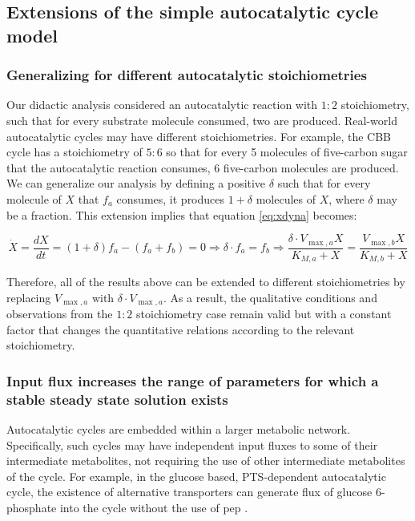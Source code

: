 \subsection{Extensions of the simple autocatalytic cycle model}
    \subsubsection{Generalizing for different autocatalytic stoichiometries}
    Our didactic analysis considered an autocatalytic reaction with $1\mathbin{:}2$ stoichiometry, such that for every substrate molecule consumed, two are produced.
    Real-world autocatalytic cycles may have different stoichiometries.
    For example, the CBB cycle has a stoichiometry of $5\mathbin{:}6$ so that for every 5 molecules of five-carbon sugar that the autocatalytic reaction consumes, 6 five-carbon molecules are produced.
    We can generalize our analysis by defining a positive $\delta$ such that for every molecule of $X$ that $f_a$ consumes, it produces $1+\delta$ molecules of $X$, where $\delta$ may be a fraction.
    This extension implies that equation \eqref{eq:xdyna} becomes:

    \begin{equation*}
      \dot X = \frac{dX}{dt} = (1+\delta)f_a - (f_a + f_b) = 0 \Rightarrow \delta \cdot f_a = f_b \Rightarrow \frac{\delta \cdot V_{\max,a}X}{K_{M,a}+X}=\frac{V_{\max,b}X}{K_{M,b}+X}
    \end{equation*}

    Therefore, all of the results above can be extended to different stoichiometries by replacing $V_{\max,a}$ with $\delta \cdot V_{\max,a}$.
    As a result, the qualitative conditions and observations from the $1\mathbin{:}2$ stoichiometry case remain valid but with a constant factor that changes the quantitative relations according to the relevant stoichiometry.
\subsubsection{Input flux increases the range of parameters for which a stable steady state solution exists}
    Autocatalytic cycles are embedded within a larger metabolic network.
    Specifically, such cycles may have independent input fluxes to some of their intermediate metabolites, not requiring the use of other intermediate metabolites of the cycle.
    For example, in the glucose based, PTS-dependent autocatalytic cycle, the existence of alternative transporters can generate flux of glucose 6-phosphate into the cycle without the use of pep \cite{Ferenci1996-nv}.


